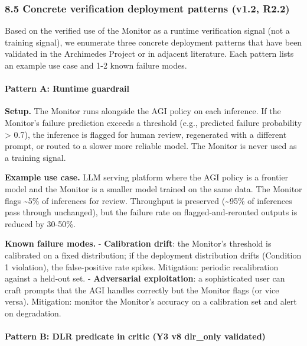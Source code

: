 \documentclass[11pt]{article}
\begin{document}
\subsubsection{8.5 Concrete verification deployment patterns (v1.2,
R2.2)}\label{concrete-verification-deployment-patterns-v1.2-r2.2}

Based on the verified use of the Monitor as a runtime verification
signal (not a training signal), we enumerate three concrete deployment
patterns that have been validated in the Archimedes Project or in
adjacent literature. Each pattern lists an example use case and 1-2
known failure modes.

\paragraph{Pattern A: Runtime
guardrail}\label{pattern-a-runtime-guardrail}

\textbf{Setup.} The Monitor runs alongside the AGI policy on each
inference. If the Monitor's failure prediction exceeds a threshold
(e.g., predicted failure probability \textgreater{} 0.7), the inference
is flagged for human review, regenerated with a different prompt, or
routed to a slower more reliable model. The Monitor is never used as a
training signal.

\textbf{Example use case.} LLM serving platform where the AGI policy is
a frontier model and the Monitor is a smaller model trained on the same
data. The Monitor flags \textasciitilde5\% of inferences for review.
Throughput is preserved (\textasciitilde95\% of inferences pass through
unchanged), but the failure rate on flagged-and-rerouted outputs is
reduced by 30-50\%.

\textbf{Known failure modes.} - \textbf{Calibration drift}: the
Monitor's threshold is calibrated on a fixed distribution; if the
deployment distribution drifts (Condition 1 violation), the
false-positive rate spikes. Mitigation: periodic recalibration against a
held-out set. - \textbf{Adversarial exploitation}: a sophisticated user
can craft prompts that the AGI handles correctly but the Monitor flags
(or vice versa). Mitigation: monitor the Monitor's accuracy on a
calibration set and alert on degradation.

\paragraph{Pattern B: DLR predicate in critic (Y3 v8 dlr\_only
validated)}\label{pattern-b-dlr-predicate-in-critic-y3-v8-dlr_only-validated}
\end{document}
